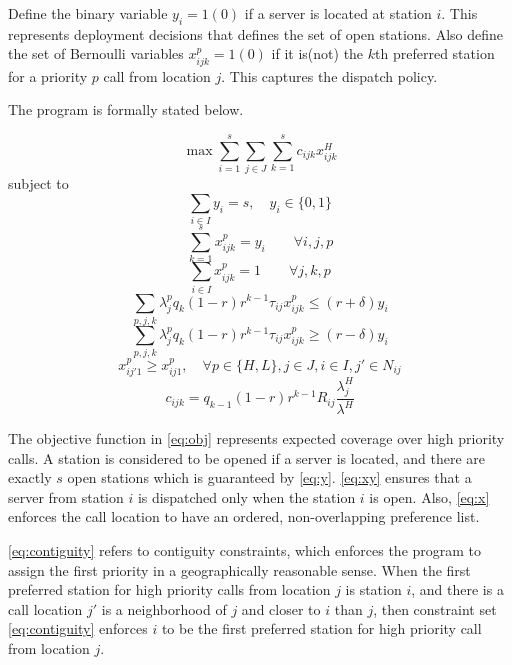 \documentclass{article}
\begin{document}
Define the binary variable $y_i=1(0)$ if a server is located at station $i$. This represents deployment decisions that defines the set of open stations. Also define the set of Bernoulli variables $x^p_{ijk}=1(0)$ if it is(not) the $k$th preferred station for a priority $p$ call from location $j$. This captures the dispatch policy. 




The program is formally stated below. 

\begin{equation} \label{eq:obj}
\max \sum_{i=1}^s \sum_{j \in J} \sum_{k=1}^s c_{ijk} x^H_{ijk}
\end{equation}
subject to
\begin{equation} \label{eq:y}
\sum_{i \in I} y_i =s, \quad y_i \in \{ 0,1\}
\end{equation}
\begin{equation} \label{eq:xy}
\sum_{k=1}^s x_{ijk}^p  = y_i \qquad \forall i,j,p
\end{equation}
\begin{equation} \label{eq:x}
\sum_{i \in I} x_{ijk}^p = 1 \qquad \forall j,k,p
\end{equation}
\begin{equation} \label{eq:bal1}
\sum_{p,j,k} \lambda_{j}^{p} q_{k} (1-r)r^{k-1} \tau_{ij} x_{ijk}^p \leq (r+\delta) y_i
\end{equation}
\begin{equation} \label{eq:bal2}
\sum_{p,j,k} \lambda_{j}^{p} q_{k} (1-r)r^{k-1} \tau_{ij} x_{ijk}^p \geq (r-\delta) y_i
\end{equation}
\begin{equation} \label{eq:contiguity}
x_{ij'1}^p \geq x_{ij1}^p, \quad \forall p \in \{H,L\},  j \in J,i \in I, j' \in N_{ij}
\end{equation}
\begin{equation} \label{eq:coefficient}
c_{ijk}=q_{k-1}(1-r) r^{k-1} R_{ij} \frac{\lambda_j^H}{\lambda^H} 
\end{equation}

The objective function in \eqref{eq:obj} represents expected coverage over high priority calls. A station is considered to be opened if a server is located, and there are exactly $s$ open stations which is guaranteed by \eqref{eq:y}.
\eqref{eq:xy} ensures that a server from station $i$ is dispatched only when the station $i$ is open. Also, \eqref{eq:x} enforces the call location to have an ordered, non-overlapping preference list. 

\eqref{eq:contiguity} refers to contiguity constraints, which enforces the program to assign the first priority in a geographically reasonable sense. When the first preferred station for high priority calls from location $j$ is station $i$, and there is a call location $j'$ is a neighborhood of $j$ and closer to $i$ than $j$, then constraint set \eqref{eq:contiguity} enforces $i$ to be the first preferred station for high priority call from location $j$.
\end{document}
